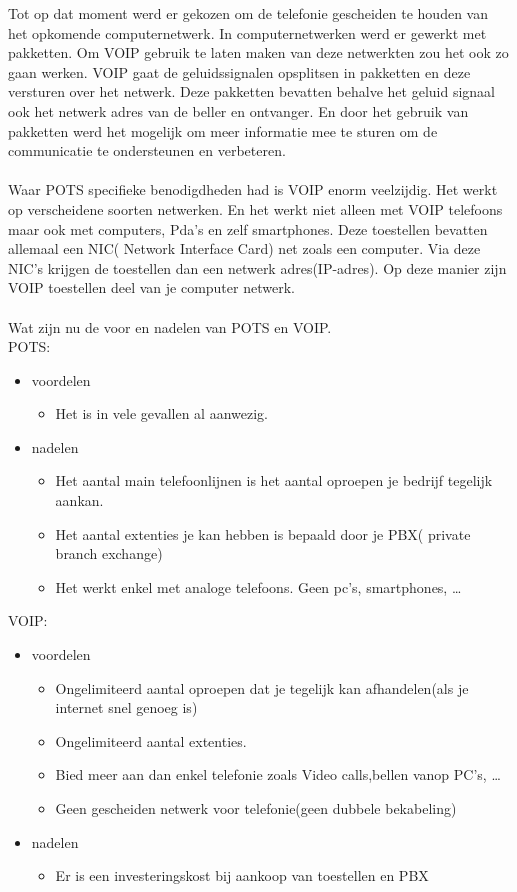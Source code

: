 \documentclass[pdftex,a4paper,12pt,twoside]{report}
\begin{document}
Tot op dat moment werd er gekozen om de telefonie gescheiden te houden van het opkomende computernetwerk. In computernetwerken werd er gewerkt met pakketten. Om VOIP gebruik te laten maken van deze netwerkten zou het ook zo gaan werken. VOIP gaat de geluidssignalen opsplitsen in pakketten en deze versturen over het netwerk. Deze pakketten bevatten behalve het geluid signaal ook het netwerk adres van de beller en ontvanger. En door het gebruik van pakketten werd het mogelijk om meer informatie mee te sturen om de communicatie te ondersteunen en verbeteren. \\ \\
Waar POTS specifieke benodigdheden had is VOIP enorm veelzijdig. Het werkt op verscheidene soorten netwerken. En het werkt niet alleen met VOIP telefoons maar ook met computers, Pda’s en zelf smartphones. Deze toestellen bevatten allemaal een NIC( Network Interface Card) net zoals een computer. Via deze NIC’s krijgen de toestellen dan een netwerk adres(IP-adres). Op deze manier zijn VOIP toestellen deel van je computer netwerk. \\ \\
Wat zijn nu de voor en nadelen van POTS en VOIP.\\

POTS: 
\begin{itemize}
	\item voordelen
	\begin{itemize}
		\item Het is in vele gevallen al aanwezig.
	\end{itemize}
	\item nadelen
	\begin{itemize}
		\item Het aantal main telefoonlijnen is het aantal oproepen je bedrijf tegelijk aankan. 
		\item Het aantal extenties je kan hebben is bepaald door je PBX( private branch exchange)
		\item Het werkt enkel met analoge telefoons. Geen pc's, smartphones, \ldots
	\end{itemize}
\end{itemize} 
VOIP: 
\begin{itemize}
	\item voordelen
	\begin{itemize}
		\item Ongelimiteerd aantal oproepen dat je tegelijk kan afhandelen(als je internet snel genoeg is)
		\item Ongelimiteerd aantal extenties.
		\item Bied meer aan dan enkel telefonie zoals Video calls,bellen vanop PC's, \ldots
		\item Geen gescheiden netwerk voor telefonie(geen dubbele bekabeling)
	\end{itemize}
	\item nadelen
	\begin{itemize}
		\item Er is een investeringskost bij aankoop van toestellen en PBX
	\end{itemize}
\end{itemize} 
\end{document}
